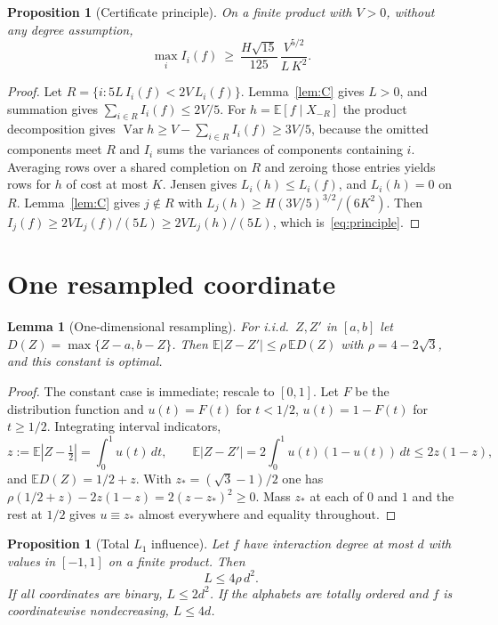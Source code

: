 \documentclass[11pt]{article}
\numberwithin{equation}{section}
\newcommand{\E}{\mathbb{E}}
\newcommand{\V}{\operatorname{Var}}
\theoremstyle{plain}
\newtheorem{proposition}[theorem]{Proposition}
\newtheorem{lem}{Lemma}
\theoremstyle{remark}
\begin{document}
\begin{proposition}[Certificate principle]\label{prop:principle}
On a finite product with $V>0$, without any degree assumption,
\begin{equation}\label{eq:principle}
\max_iI_i(f)\ \ge\ \frac{H\sqrt{15}}{125}\,\frac{V^{5/2}}{L\,K^2}.
\end{equation}
\end{proposition}

\begin{proof}
Let $R=\{i:5L\,I_i(f)<2V\,L_i(f)\}$. Lemma~\ref{lem:C} gives $L>0$, and summation gives $\sum_{i\in R}I_i(f)\le2V/5$. For $h=\E[f\mid X_{-R}]$ the product decomposition gives $\V h\ge V-\sum_{i\in R}I_i(f)\ge3V/5$, because the omitted components meet $R$ and $I_i$ sums the variances of components containing $i$. Averaging rows over a shared completion on $R$ and zeroing those entries yields rows for $h$ of cost at most $K$. Jensen gives $L_i(h)\le L_i(f)$, and $L_i(h)=0$ on $R$. Lemma~\ref{lem:C} gives $j\notin R$ with $L_j(h)\ge H(3V/5)^{3/2}/(6K^2)$. Then $I_j(f)\ge2V L_j(f)/(5L)\ge 2VL_j(h)/(5L)$, which is~\eqref{eq:principle}.
\end{proof}

\section{One resampled coordinate}\label{sec:resample}
\begin{lem}[One-dimensional resampling]\label{lem:D}
For i.i.d.\ $Z,Z'$ in $[a,b]$ let $D(Z)=\max\{Z-a,b-Z\}$. Then $\E|Z-Z'|\le\rho\,\E D(Z)$ with $\rho=4-2\sqrt3$, and this constant is optimal.
\end{lem}

\begin{proof}
The constant case is immediate; rescale to $[0,1]$. Let $F$ be the distribution function and $u(t)=F(t)$ for $t<1/2$, $u(t)=1-F(t)$ for $t\ge1/2$. Integrating interval indicators,
\[
z:=\E|Z-\tfrac12|=\int_0^1u(t)\,dt,\qquad \E|Z-Z'|=2\int_0^1u(t)(1-u(t))\,dt\le2z(1-z),
\]
and $\E D(Z)=1/2+z$. With $z_*=(\sqrt3-1)/2$ one has $\rho(1/2+z)-2z(1-z)=2(z-z_*)^2\ge 0$. Mass $z_*$ at each of $0$ and $1$ and the rest at $1/2$ gives $u\equiv z_*$ almost everywhere and equality throughout.
\end{proof}

\begin{proposition}[Total $L_1$ influence]\label{prop:L}
Let $f$ have interaction degree at most $d$ with values in $[-1,1]$ on a finite product. Then
\begin{equation}\label{eq:Lbound}
L\le 4\rho\,d^2 .
\end{equation}
If all coordinates are binary, $L\le2d^2$. If the alphabets are totally ordered and $f$ is coordinatewise nondecreasing, $L\le4d$.
\end{proposition}
\end{document}
